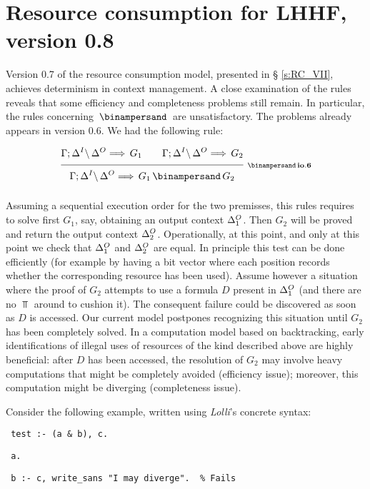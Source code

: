 \newpage
\section{Resource consumption for LHHF, version 0.8}
\label{s:RC_VIII}

Version 0.7 of the resource consumption model, presented in \S
\ref{s:RC_VII}, achieves determinism in context management. A close
examination of the rules reveals that some efficiency and completeness
problems still remain. In particular, the rules concerning $\With$ are
unsatisfactory. The problems already appears in version 0.6. We had the
following rule:

$$
\ruleII
  {\ioVI{\G;\D^I}{\D^O}{G_1}}
  {\ioVI{\G;\D^I}{\D^O}{G_2}}
  {\ioVI{\G;\D^I}{\D^O}{G_1 \With G_2}}
  {\With io.6}
$$

\noindent
Assuming a sequential execution order for the two premisses, this rules
requires to solve first $G_1$, say, obtaining an output context $\Delta^O_1$.
Then $G_2$ will be proved and return the output context $\Delta^O_2$.
Operationally, at this point, and only at this point we check that $\Delta^O_1$
and $\Delta^O_2$ are equal. In principle this test can be done efficiently (for
example by having a bit vector where each position records whether the
corresponding resource has been used). Assume however a situation where the
proof of $G_2$ attempts to use a formula $D$ present in $\Delta^O_1$ (and there
are no $\Top$ around to cushion it). The consequent failure could be
discovered as soon as $D$ is accessed. Our current model postpones
recognizing this situation until $G_2$ has been completely solved. In a
computation model based on backtracking, early identifications of illegal
uses of resources of the kind described above are highly beneficial: after
$D$ has been accessed, the resolution of $G_2$ may involve heavy computations
that might be completely avoided (efficiency issue); moreover, this
computation might be diverging (completeness issue).

Consider the following example, written using {\em Lolli\/}'s concrete
syntax:

\medskip

{\tt \hspace*{2em} \indent test :- (a \& b), c.\rule[-2ex]{0ex}{1ex}}

{\tt \hspace*{2em} \indent a.\rule[-2ex]{0ex}{1ex}}

{\tt \hspace*{2em} \indent b :- c, write\_sans "I may diverge".\ \ \% Fails}

